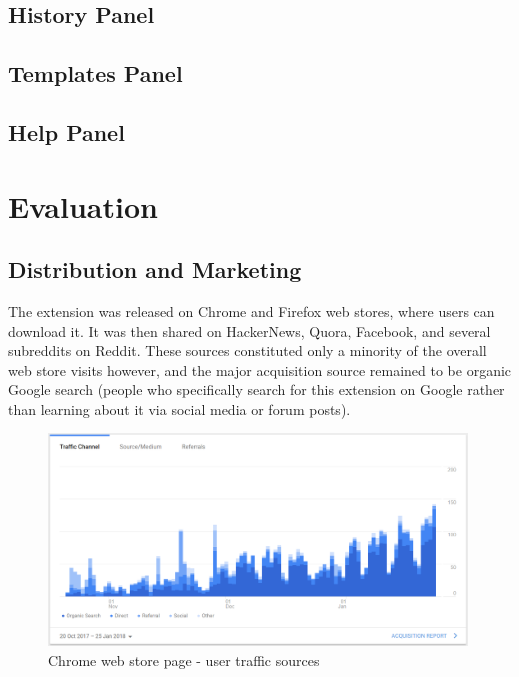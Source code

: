 \documentclass[bsc,frontabs,twoside,singlespacing,parskip,deptreport]{infthesis}
\begin{document}
\section{History Panel}
\section{Templates Panel}
\section{Help Panel}


\chapter{Evaluation}
\section{Distribution and Marketing}
The extension was released on Chrome and Firefox web stores, where users can download it. It was then shared on HackerNews, Quora, Facebook, and several subreddits on Reddit. These sources constituted only a minority of the overall web store visits however, and the major acquisition source remained to be organic Google search (people who specifically search for this extension on Google rather than learning about it via social media or forum posts).

\begin{figure}[h]
\centering
\includegraphics[width=0.99\textwidth]{../docs/user-acquisition.png}
\caption{Chrome web store page - user traffic sources}
\end{figure}
\end{document}
